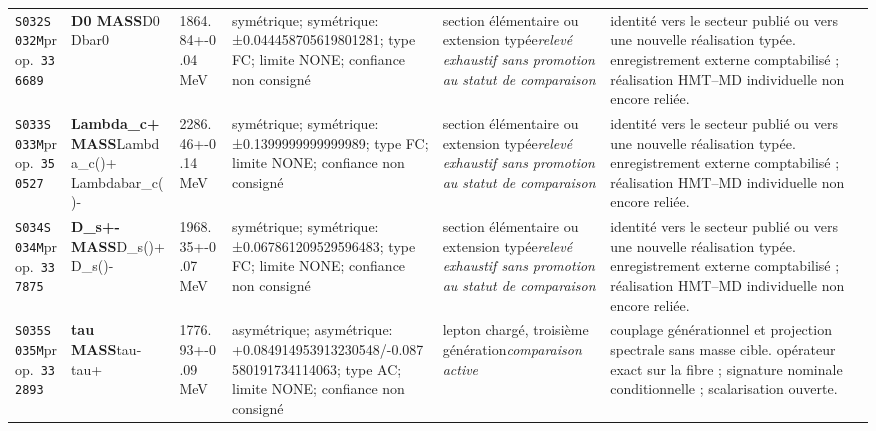 \begin{landscape}
\begin{longtable}{L{1.85cm}L{4.45cm}L{2.35cm}L{4.05cm}L{3.35cm}L{7.15cm}}
\texttt{S032}\newline \texttt{S032M}\newline prop.\ \texttt{336689} & \textbf{D0 MASS}\newline D0 \textbar{}\allowbreak{} Dbar0 & 1864.84+-0.04\,MeV & symétrique; symétrique: ±0.044458705619801281; type FC; limite NONE; confiance non consigné & section élémentaire ou extension typée\newline \emph{relevé exhaustif sans promotion au statut de comparaison} & identité vers le secteur publié ou vers une nouvelle réalisation typée. enregistrement externe comptabilisé ; réalisation HMT--MD individuelle non encore reliée. \\
\texttt{S033}\newline \texttt{S033M}\newline prop.\ \texttt{350527} & \textbf{Lambda\_\allowbreak{}c+ MASS}\newline Lambda\_\allowbreak{}c()+ \textbar{}\allowbreak{} Lambdabar\_\allowbreak{}c()- & 2286.46+-0.14\,MeV & symétrique; symétrique: ±0.1399999999999989; type FC; limite NONE; confiance non consigné & section élémentaire ou extension typée\newline \emph{relevé exhaustif sans promotion au statut de comparaison} & identité vers le secteur publié ou vers une nouvelle réalisation typée. enregistrement externe comptabilisé ; réalisation HMT--MD individuelle non encore reliée. \\
\texttt{S034}\newline \texttt{S034M}\newline prop.\ \texttt{337875} & \textbf{D\_\allowbreak{}s+- MASS}\newline D\_\allowbreak{}s()+ \textbar{}\allowbreak{} D\_\allowbreak{}s()- & 1968.35+-0.07\,MeV & symétrique; symétrique: ±0.067861209529596483; type FC; limite NONE; confiance non consigné & section élémentaire ou extension typée\newline \emph{relevé exhaustif sans promotion au statut de comparaison} & identité vers le secteur publié ou vers une nouvelle réalisation typée. enregistrement externe comptabilisé ; réalisation HMT--MD individuelle non encore reliée. \\
\texttt{S035}\newline \texttt{S035M}\newline prop.\ \texttt{332893} & \textbf{tau MASS}\newline tau- \textbar{}\allowbreak{} tau+ & 1776.93+-0.09\,MeV & asymétrique; asymétrique: +0.084914953913230548/-0.087580191734114063; type AC; limite NONE; confiance non consigné & lepton chargé, troisième génération\newline \emph{comparaison active} & couplage générationnel et projection spectrale sans masse cible. opérateur exact sur la fibre ; signature nominale conditionnelle ; scalarisation ouverte. \\

\end{longtable}
\end{landscape}
